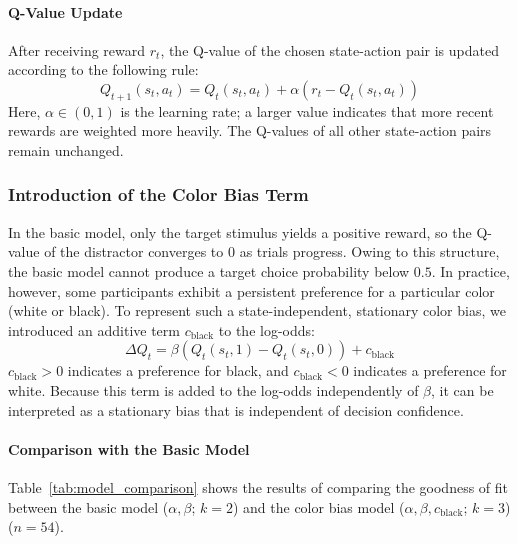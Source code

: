 \documentclass[dvipdfmx]{article}
\begin{document}
\paragraph{Q-Value Update}
After receiving reward $r_t$, the Q-value of the chosen state-action pair is updated according to the following rule:
\begin{equation}
    Q_{t+1}(s_t, a_t) = Q_t(s_t, a_t) + \alpha \left( r_t - Q_t(s_t, a_t) \right)
\end{equation}
Here, $\alpha \in (0, 1)$ is the learning rate; a larger value indicates that more recent rewards are weighted more heavily.
The Q-values of all other state-action pairs remain unchanged.

\subsubsection{Introduction of the Color Bias Term}

In the basic model, only the target stimulus yields a positive reward, so the Q-value of the distractor converges to $0$ as trials progress.
Owing to this structure, the basic model cannot produce a target choice probability below $0.5$.
In practice, however, some participants exhibit a persistent preference for a particular color (white or black).
To represent such a state-independent, stationary color bias, we introduced an additive term $c_\mathrm{black}$ to the log-odds:
\begin{equation}
    \Delta Q_t = \beta \left( Q_t(s_t, 1) - Q_t(s_t, 0) \right) + c_\mathrm{black}
\end{equation}
$c_\mathrm{black} > 0$ indicates a preference for black, and $c_\mathrm{black} < 0$ indicates a preference for white.
Because this term is added to the log-odds independently of $\beta$, it can be interpreted as a stationary bias that is independent of decision confidence.

\paragraph{Comparison with the Basic Model}
Table~\ref{tab:model_comparison} shows the results of comparing the goodness of fit between the basic model ($\alpha, \beta$; $k=2$) and the color bias model ($\alpha, \beta, c_\mathrm{black}$; $k=3$) ($n=54$).
\end{document}
